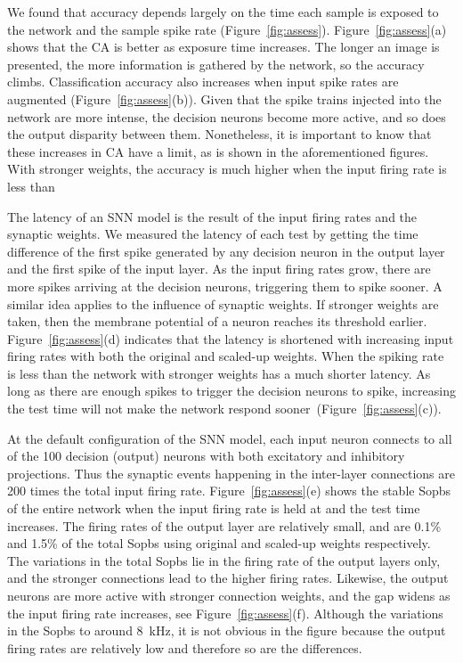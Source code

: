 We found that accuracy depends largely on the time each sample is exposed to the network and the sample spike rate (Figure~\ref{fig:assess}).
Figure~\ref{fig:assess}(a) shows that the CA is better as exposure time increases. The longer an image is presented, the more information is gathered by the network, so the accuracy climbs.
Classification accuracy also increases when input spike rates are augmented (Figure~\ref{fig:assess}(b)).
Given that the spike trains injected into the network are more intense, the decision neurons become more active, and so does the output disparity between them.
Nonetheless, it is important to know that these increases in CA have a limit, as is shown in the aforementioned figures.
With stronger weights, the accuracy is much higher when the input firing rate is less than \protect{} \protect{}


The latency of an SNN model is the result of the input firing rates and the synaptic weights.
We measured the latency of each test by getting the time difference of the first spike generated by any decision neuron in the output layer and the first spike of the input layer.
As the input firing rates grow, there are more spikes arriving at the decision neurons, triggering them to spike sooner.
A similar idea applies to the influence of synaptic weights.
If stronger weights are taken, then the membrane potential of a neuron reaches its threshold earlier.
Figure~\ref{fig:assess}(d) indicates that the latency is shortened with increasing input firing rates with both the original and scaled-up weights.
When the spiking rate is less than \protect{} \protect{} the network with stronger weights has a much shorter latency.
As long as there are enough spikes to trigger the decision neurons to spike, increasing the test time will not make the network respond sooner~(Figure~\ref{fig:assess}(c)).

At the default configuration of the SNN model, each input neuron connects to all of the 100 decision (output) neurons with both excitatory and inhibitory projections.
Thus the synaptic events happening in the inter-layer connections are 200 times the total input firing rate.
Figure~\ref{fig:assess}(e) shows the stable Sopbs of the entire network when the input firing rate is held at \protect{} \protect{} and the test time increases.
The firing rates of the output layer are relatively small, and are 0.1\% and 1.5\% of the total Sopbs using original and scaled-up weights respectively.
The variations in the total Sopbs lie in the firing rate of the output layers only, and the stronger connections lead to the higher firing rates.
Likewise, the output neurons are more active with stronger connection weights, and the gap widens as the input firing rate increases, see Figure~\ref{fig:assess}(f).
Although the variations in the Sopbs \protect{} \protect{} to around 8~kHz, it is not obvious in the figure because the output firing rates are relatively low and therefore so are the differences.


